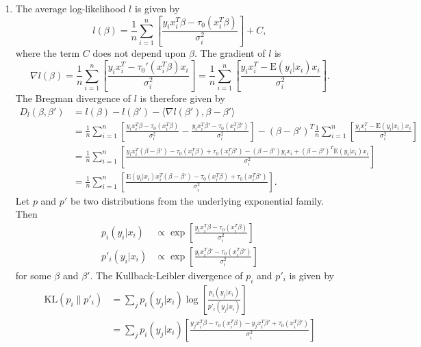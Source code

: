 \documentclass[12pt]{article}
\newcommand{\E}{\mathrm{E}}
\begin{document}
\begin{enumerate}
\item
The average log-likelihood $l$ is given by
\begin{equation*}
l(\beta) = \frac{1}{n} \sum_{i=1}^n \left[\frac{y_i x_i^T \beta - \tau_0(x_i^T \beta)}{\sigma_i^2}\right] + C,
\end{equation*}
where the term $C$ does not depend upon $\beta$. The gradient of $l$ is
\begin{equation*}
\nabla l(\beta) = \frac{1}{n} \sum_{i=1}^n \left[\frac{y_i x_i^T - \tau_0'(x_i^T \beta)x_i}{\sigma_i^2}\right] = \frac{1}{n} \sum_{i=1}^n \left[\frac{y_i x_i^T - \E(y_i | x_i) x_i}{\sigma_i^2}\right].
\end{equation*}
The Bregman divergence of $l$ is therefore given by
\begin{align*}
D_l(\beta, \beta') &= l(\beta) - l(\beta') - \langle \nabla l(\beta'), \beta - \beta' \rangle \\
&= \frac{1}{n} \sum_{i=1}^n \left[\frac{y_i x_i^T \beta - \tau_0(x_i^T \beta)}{\sigma_i^2} - \frac{y_i x_i^T \beta' - \tau_0(x_i^T \beta')}{\sigma_i^2}\right] - (\beta - \beta')^T \frac{1}{n} \sum_{i=1}^n \left[\frac{y_i x_i^T - \E(y_i | x_i) x_i}{\sigma_i^2}\right] \\
&= \frac{1}{n} \sum_{i=1}^n \left[\frac{y_i x_i^T(\beta - \beta') - \tau_0(x_i^T \beta) + \tau_0(x_i^T \beta') - (\beta - \beta')y_i x_i + (\beta - \beta')^T \E(y_i | x_i) x_i}{\sigma_i^2}\right] \\
&= \frac{1}{n} \sum_{i=1}^n \left[\frac{\E(y_i | x_i) x_i^T (\beta - \beta') - \tau_0(x_i^T \beta) + \tau_0(x_i^T \beta')}{\sigma_i^2}\right].
\end{align*}
Let $p$ and $p'$ be two distributions from the underlying exponential family. Then
\begin{align*}
p_i(y_i | x_i) &\propto \exp\left[\frac{y_i x_i^T \beta - \tau_0(x_i^T \beta)}{\sigma_i^2}\right] \\
p'_i(y_i | x_i) &\propto \exp\left[\frac{y_i x_i^T \beta' - \tau_0(x_i^T \beta')}{\sigma_i^2}\right]
\end{align*}
for some $\beta$ and $\beta'$. The Kullback-Leibler divergence of $p_i$ and $p'_i$ is given by
\begin{align*}
\mathrm{KL}(p_i \parallel p'_i) &= \sum_j p_i(y_j | x_i) \log\left[\frac{p_i(y_j | x_i)}{p'_i(y_j | x_i)}\right] \\
&= \sum_j p_i(y_j | x_i) \left[\frac{y_j x_i^T \beta - \tau_0(x_i^T \beta) - y_j x_i^T \beta' + \tau_0(x_i^T \beta')}{\sigma_i^2}\right] \\

\end{align*}
\end{enumerate}
\end{document}

